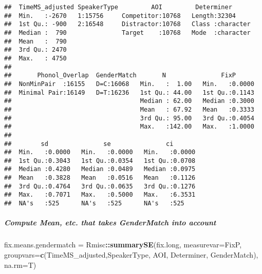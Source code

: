 \documentclass[
]{article}
\newenvironment{Shaded}{\begin{snugshade}}{\end{snugshade}}
\newcommand{\AttributeTok}[1]{\textcolor[rgb]{0.13,0.29,0.53}{#1}}
\newcommand{\FunctionTok}[1]{\textcolor[rgb]{0.13,0.29,0.53}{\textbf{#1}}}
\newcommand{\NormalTok}[1]{#1}
\newcommand{\OtherTok}[1]{\textcolor[rgb]{0.56,0.35,0.01}{#1}}
\newcommand{\SpecialCharTok}[1]{\textcolor[rgb]{0.81,0.36,0.00}{\textbf{#1}}}
\newcommand{\StringTok}[1]{\textcolor[rgb]{0.31,0.60,0.02}{#1}}
\begin{document}
\begin{verbatim}
##  TimeMS_adjusted SpeakerType         AOI         Determiner       
##  Min.   :-2670   1:15756     Competitor:10768   Length:32304      
##  1st Qu.: -900   2:16548     Distractor:10768   Class :character  
##  Median :  790               Target    :10768   Mode  :character  
##  Mean   :  790                                                    
##  3rd Qu.: 2470                                                    
##  Max.   : 4750                                                    
##                                                                   
##       Phonol_Overlap  GenderMatch       N               FixP       
##  NonMinPair  :16155   D=C:16068   Min.   :  1.00   Min.   :0.0000  
##  Minimal Pair:16149   D=T:16236   1st Qu.: 44.00   1st Qu.:0.1143  
##                                   Median : 62.00   Median :0.3000  
##                                   Mean   : 67.92   Mean   :0.3333  
##                                   3rd Qu.: 95.00   3rd Qu.:0.4054  
##                                   Max.   :142.00   Max.   :1.0000  
##                                                                    
##        sd               se               ci        
##  Min.   :0.0000   Min.   :0.0000   Min.   :0.0000  
##  1st Qu.:0.3043   1st Qu.:0.0354   1st Qu.:0.0708  
##  Median :0.4280   Median :0.0489   Median :0.0975  
##  Mean   :0.3828   Mean   :0.0516   Mean   :0.1126  
##  3rd Qu.:0.4764   3rd Qu.:0.0635   3rd Qu.:0.1276  
##  Max.   :0.7071   Max.   :0.5000   Max.   :6.3531  
##  NA's   :525      NA's   :525      NA's   :525
\end{verbatim}

\subparagraph{Compute Mean, etc. that takes GenderMatch into
account}\label{compute-mean-etc.-that-takes-gendermatch-into-account}

\begin{Shaded}
\begin{Highlighting}[]
\NormalTok{fix.means.gendermatch }\OtherTok{=}\NormalTok{ Rmisc}\SpecialCharTok{::}\FunctionTok{summarySE}\NormalTok{(fix.long, }\AttributeTok{measurevar=}\StringTok{\textquotesingle{}FixP\textquotesingle{}}\NormalTok{, }\AttributeTok{groupvars=}\FunctionTok{c}\NormalTok{(}\StringTok{\textquotesingle{}TimeMS\_adjusted\textquotesingle{}}\NormalTok{,}\StringTok{\textquotesingle{}SpeakerType\textquotesingle{}}\NormalTok{, }\StringTok{\textquotesingle{}AOI\textquotesingle{}}\NormalTok{, }\StringTok{\textquotesingle{}Determiner\textquotesingle{}}\NormalTok{, }\StringTok{\textquotesingle{}GenderMatch\textquotesingle{}}\NormalTok{), }\AttributeTok{na.rm=}\NormalTok{T)}
\end{Highlighting}
\end{Shaded}
\end{document}

